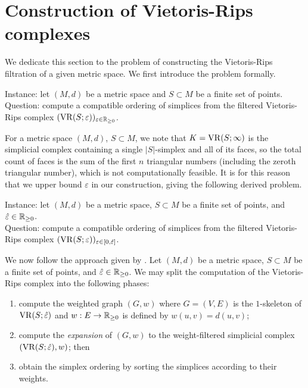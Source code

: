 \section{Construction of Vietoris-Rips complexes} \label{sec:computing-complexes}
\label{sec:vietoris-rips-construction}

We dedicate this section to the problem of constructing the Vietoris-Rips filtration of a given metric space. We first introduce the problem formally. 

\begin{problem}[VRFilt]
Instance: let $(M,d)$ be a metric space and $S \subset M$ be a finite set of points. \\
Question: compute a compatible ordering of simplices from the filtered Vietoris-Rips complex $(\operatorname{VR}(S; \varepsilon))_{\varepsilon \in \mathbb R_{\geq 0}}$.
\end{problem}

For a metric space $(M, d)$, $S \subset M$, we note that $K = \operatorname{VR}(S; \infty)$ is the simplicial complex containing a single $\lvert S \rvert$-simplex and all of its faces, so the total count of faces is the sum of the first $n$ triangular numbers (including the zeroth triangular number), which is not computationally feasible. It is for this reason that we upper bound $\varepsilon$ in our construction, giving the following derived problem.

\begin{problem}
Instance: let $(M,d)$ be a metric space, $S \subset M$ be a finite set of points, and $\hat\varepsilon \in \mathbb R_{\geq 0}$. \\
Question: compute a compatible ordering of simplices from the filtered Vietoris-Rips complex $(\operatorname{VR}(S; \varepsilon))_{\varepsilon \in [0, \hat\varepsilon]}$.
\end{problem}

We now follow the approach given by \textcite{zomorodian2010fast}. Let $(M,d)$ be a metric space, $S \subset M$ be a finite set of points, and $\hat\varepsilon \in \mathbb R_{\geq 0}$. We may split the computation of the Vietoris-Rips complex into the following phases:
\begin{enumerate}
    \item compute the weighted graph $(G, w)$ where $G = (V,E)$ is the $1$-skeleton of $\operatorname{VR}(S; \hat\varepsilon)$ and $w: E \to \mathbb R_{\geq 0}$ is defined by $w(u,v) = d(u,v)$;
    \item compute the \emph{expansion} of $(G, w)$ to the weight-filtered simplicial complex $(\operatorname{VR}(S; \hat\varepsilon), w)$; then
    \item obtain the simplex ordering by sorting the simplices according to their weights.
\end{enumerate}

